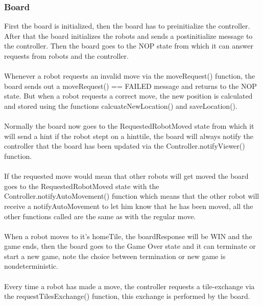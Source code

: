     \subsubsection{Board}
	First the board is initialized, then the board has to preinitialize the controller. After that the board initializes the robots and sends a postinitialize message to the controller. Then the board goes to the NOP state from which it can answer requests from robots and the controller. \\
\\
Whenever a robot requests an invalid move via the moveRequest() function, the board sends out a moveRequest() == FAILED message and returns to the NOP state. But when a robot requests a correct move, the new position is calculated and stored using the functions calcuateNewLocation() and saveLocation(). \\
\\
Normally the board now goes to the RequestedRobotMoved state from which it will send a hint if the robot stept on a hinttile, the board will always notify the controller that the board has been updated via the Controller.notifyViewer() function.\\
\\
If the requested move would mean that other robots will get moved the board goes to the RequestedRobotMoved state with the Controller.notifyAutoMovement() function which means that the other robot will receive a notifyAutoMovement to let him know that he has been moved, all the other functions called are the same as with the regular move.\\
\\
When a robot moves to it's homeTile, the boardResponse will be WIN and the game ends, then the board goes to the Game Over state and it can terminate or start a new game, note the choice between termination or new game is nondeterministic.\\
\\
Every time a robot has made a move, the controller requests a tile-exchange via the requestTilesExchange() function, this exchange is performed by the board.\\
	
